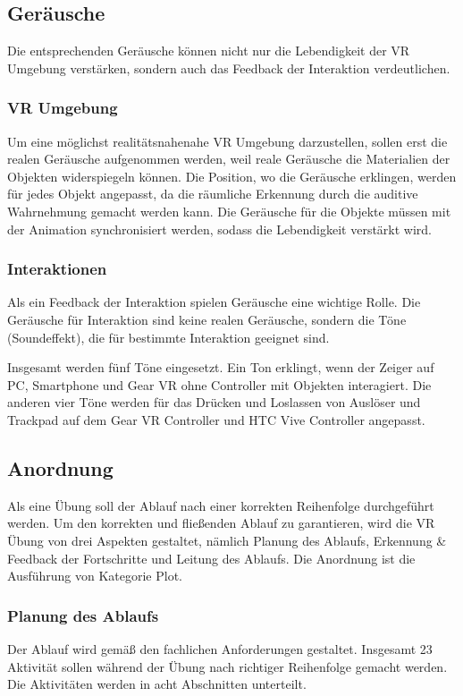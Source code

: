  \subsection{Geräusche}
 Die entsprechenden Geräusche können nicht nur die Lebendigkeit der VR Umgebung verstärken, sondern auch das Feedback der Interaktion verdeutlichen.
 \subsubsection{VR Umgebung}
 Um eine möglichst realitätsnahenahe VR Umgebung darzustellen, sollen erst die realen Geräusche aufgenommen werden, weil reale Geräusche die Materialien der Objekten widerspiegeln können. Die Position, wo die Geräusche erklingen, werden für jedes Objekt angepasst, da die räumliche Erkennung durch die auditive Wahrnehmung gemacht werden kann. Die Geräusche für die Objekte müssen mit der Animation synchronisiert werden, sodass die Lebendigkeit verstärkt wird.
 
 \subsubsection{Interaktionen}
 Als ein Feedback der Interaktion spielen Geräusche eine wichtige Rolle. Die Geräusche für Interaktion sind keine realen Geräusche, sondern die Töne (Soundeffekt), die für bestimmte Interaktion geeignet sind.
 
 Insgesamt werden fünf Töne eingesetzt. Ein Ton erklingt, wenn der Zeiger auf PC, Smartphone und Gear VR ohne Controller mit Objekten interagiert. Die anderen vier Töne werden für das Drücken und Loslassen von Auslöser und Trackpad auf dem Gear VR Controller und HTC Vive Controller angepasst.
 
 \subsection{Anordnung}
 Als eine Übung soll der Ablauf nach einer korrekten Reihenfolge durchgeführt werden. Um den korrekten und fließenden Ablauf zu garantieren, wird die VR Übung von drei Aspekten gestaltet, nämlich Planung des Ablaufs, Erkennung \& Feedback der Fortschritte und Leitung des Ablaufs. Die Anordnung ist die Ausführung von Kategorie \glqq Plot\grqq.
  \subsubsection{Planung des Ablaufs}
      
  Der Ablauf wird gemäß den fachlichen Anforderungen gestaltet. Insgesamt 23 Aktivität sollen während der Übung nach richtiger Reihenfolge gemacht werden. Die Aktivitäten werden in acht Abschnitten unterteilt.
  
